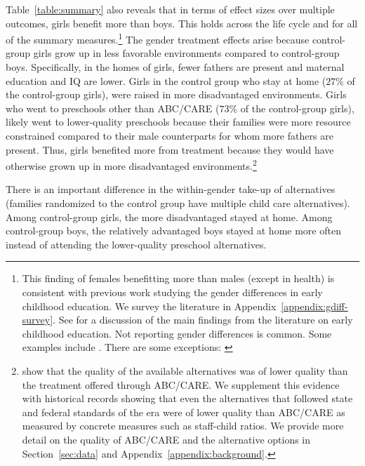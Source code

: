 Table~\ref{table:summary} also reveals that in terms of effect sizes over multiple outcomes, girls benefit more than boys. This holds across the life cycle and for all of the summary measures.\footnote{This finding of females benefitting more than males (except in health) is consistent with previous work studying the gender differences in early childhood education. We survey the literature in Appendix~\ref{appendix:gdiff-survey}. See \citet{Elango_Hojman_etal_2016_Early-Edu} for a discussion of the main findings from the literature on early childhood education. Not reporting gender differences is common. Some examples include \citet{Bernal_Keane_2011_JoLE,Cascio_Schanzenbach_2013_ImpactsExpandingAccess,Bitler_et_al_2014_Head_Start_Unpublished,Kline_Walters_2016_QJE}. There are some exceptions: \citet{Anderson_2008_JASA,Heckman_Moon_etal_2010_QE,Campbell_Conti_etal_2014_EarlyChildhoodInvestments,Garcia_Heckman_Leaf_etal_2017_Comp_CBA_Unpublished}} The gender treatment effects arise because control-group girls grow up in less favorable environments compared to control-group boys. Specifically, in the homes of girls, fewer fathers are present and maternal education and IQ are lower. Girls in the control group who stay at home ($27\%$ of the control-group girls), were raised in more disadvantaged environments. Girls who went to preschools other than ABC/CARE ($73\%$ of the control-group girls), likely went to lower-quality preschools because their families were more resource constrained compared to their male counterparts for whom more fathers are present. Thus, girls benefited more from treatment because they would have otherwise grown up in more disadvantaged environments.\footnote{\citet{Burchinal_etal_1989_CD_Daycare-Pre-K-Dev} show that the quality of the available alternatives was of lower quality than the treatment offered through ABC/CARE. We supplement this evidence with historical records showing that even the alternatives that followed state and federal standards of the era were of lower quality than ABC/CARE as measured by concrete measures such as staff-child ratios. We provide more detail on the quality of ABC/CARE and the alternative options in Section~\ref{sec:data} and Appendix~\ref{appendix:background}.}

There is an important difference in the within-gender take-up of alternatives (families randomized to the control group have multiple child care alternatives). Among control-group girls, the more disadvantaged stayed at home. Among control-group boys, the relatively advantaged boys stayed at home more often instead of attending the lower-quality preschool alternatives. 

